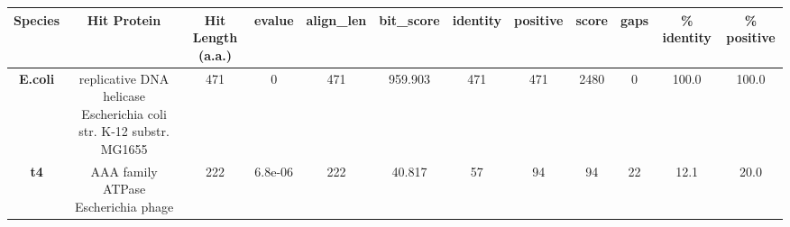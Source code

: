 \begin{tabular}{|c|c|c|c|c|c|c|c|c|c|c|c|} \hline
\textbf{Species} & \textbf{Hit Protein} & \textbf{Hit Length (a.a.)} & \textbf{evalue} & \textbf{align\_len} & \textbf{bit\_score} & \textbf{identity} & \textbf{positive} & \textbf{score} & \textbf{gaps} & \textbf{\% identity} & \textbf{\% positive} \\ \hline
\textbf{E.coli} & replicative DNA helicase Escherichia coli str. K-12 substr. MG1655 & 471 & 0 & 471 & 959.903 & 471 & 471 & 2480 & 0 & 100.0 & 100.0\\
\textbf{t4} & AAA family ATPase Escherichia phage  & 222 & 6.8e-06 & 222 & 40.817 & 57 & 94 & 94 & 22 & 12.1 & 20.0\\
\hline \end{tabular}
